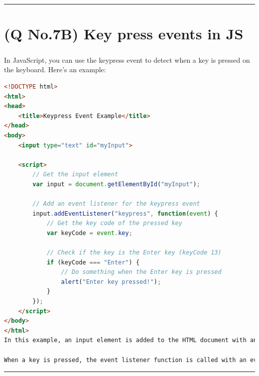 \documentclass[11pt]{article}
\begin{document}
\noindent\rule{\linewidth}{0.4pt}
\section{(Q No.7B) Key press events in JS}
\subparagraph{}
In JavaScript, you can use the keypress event to detect when a key is pressed on the keyboard. Here's an example:

\begin{lstlisting}[language=html]
    <!DOCTYPE html>
<html>
<head>
	<title>Keypress Event Example</title>
</head>
<body>
	<input type="text" id="myInput">

	<script>
		// Get the input element
		var input = document.getElementById("myInput");

		// Add an event listener for the keypress event
		input.addEventListener("keypress", function(event) {
			// Get the key code of the pressed key
			var keyCode = event.key;

			// Check if the key is the Enter key (keyCode 13)
			if (keyCode === "Enter") {
				// Do something when the Enter key is pressed
				alert("Enter key pressed!");
			}
		});
	</script>
</body>
</html>
In this example, an input element is added to the HTML document with an id of myInput. A JavaScript event listener is then added to the input element to listen for the keypress event.

When a key is pressed, the event listener function is called with an event parameter. The function first checks whether the keyCode property of the event is available. It then checks whether the key pressed is the Enter key. If the Enter key is pressed, the function displays an alert message.

\end{lstlisting}

\noindent\rule{\linewidth}{0.4pt}
\end{document}
